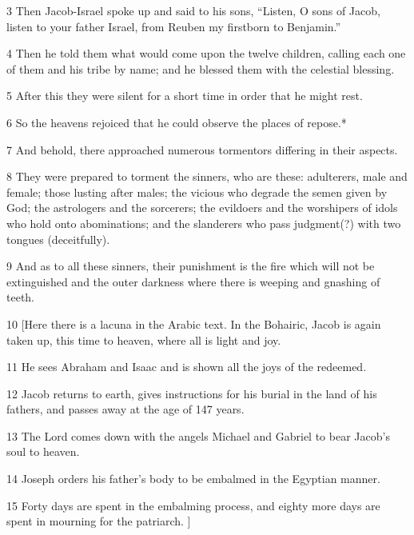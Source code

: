 \par 3 Then Jacob-Israel spoke up and said to his sons, “Listen, O sons of Jacob, listen to your father Israel, from Reuben my firstborn to Benjamin.” 

\par 4 Then he told them what would come upon the twelve children, calling each one of them and his tribe by name; and he blessed them with the celestial blessing. 

\par 5 After this they were silent for a short time in order that he might rest. 

\par 6 So the heavens rejoiced that he could observe the places of repose.* 

\par 7 And behold, there approached numerous tormentors differing in their aspects.

\par 8 They were prepared to torment the sinners, who are these: adulterers, male and female; those lusting after males; the vicious who degrade the semen given by God; the astrologers and the sorcerers; the evildoers and the worshipers of idols who hold onto abominations; and the slanderers who pass judgment(?) with two tongues (deceitfully). 

\par 9 And as to all these sinners, their punishment is the fire which will not be extinguished and the outer darkness where there is weeping and gnashing of teeth.

\par 10 [Here there is a lacuna in the Arabic text. In the Bohairic, Jacob is again taken up, this time to heaven, where all is light and joy. 

\par 11 He sees Abraham and Isaac and is shown all the joys of the redeemed. 

\par 12 Jacob returns to earth, gives instructions for his burial in the land of his fathers, and passes away at the age of 147 years. 

\par 13 The Lord comes down with the angels Michael and Gabriel to bear Jacob’s soul to heaven. 

\par 14 Joseph orders his father’s body to be embalmed in the Egyptian manner. 

\par 15 Forty days are spent in the embalming process, and eighty more days are spent in mourning for the patriarch. ] 


